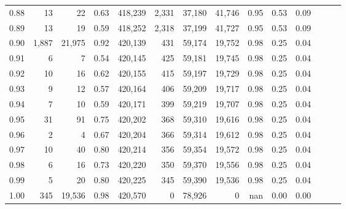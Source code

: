 \begin{tabular}{rrrrrrrrrrrrrr}
0.88 &      13 &      22 &  0.63 &  418,239 &    2,331 &  37,180 &  41,746 &  0.95 &  0.53 &      0.09 \\
0.89 &      13 &      19 &  0.59 &  418,252 &    2,318 &  37,199 &  41,727 &  0.95 &  0.53 &      0.09 \\
0.90 &   1,887 &  21,975 &  0.92 &  420,139 &      431 &  59,174 &  19,752 &  0.98 &  0.25 &      0.04 \\
0.91 &       6 &       7 &  0.54 &  420,145 &      425 &  59,181 &  19,745 &  0.98 &  0.25 &      0.04 \\
0.92 &      10 &      16 &  0.62 &  420,155 &      415 &  59,197 &  19,729 &  0.98 &  0.25 &      0.04 \\
0.93 &       9 &      12 &  0.57 &  420,164 &      406 &  59,209 &  19,717 &  0.98 &  0.25 &      0.04 \\
0.94 &       7 &      10 &  0.59 &  420,171 &      399 &  59,219 &  19,707 &  0.98 &  0.25 &      0.04 \\
0.95 &      31 &      91 &  0.75 &  420,202 &      368 &  59,310 &  19,616 &  0.98 &  0.25 &      0.04 \\
0.96 &       2 &       4 &  0.67 &  420,204 &      366 &  59,314 &  19,612 &  0.98 &  0.25 &      0.04 \\
0.97 &      10 &      40 &  0.80 &  420,214 &      356 &  59,354 &  19,572 &  0.98 &  0.25 &      0.04 \\
0.98 &       6 &      16 &  0.73 &  420,220 &      350 &  59,370 &  19,556 &  0.98 &  0.25 &      0.04 \\
0.99 &       5 &      20 &  0.80 &  420,225 &      345 &  59,390 &  19,536 &  0.98 &  0.25 &      0.04 \\
1.00 &     345 &  19,536 &  0.98 &  420,570 &        0 &  78,926 &       0 &   nan &  0.00 &      0.00 \\
\bottomrule
\end{tabular}
